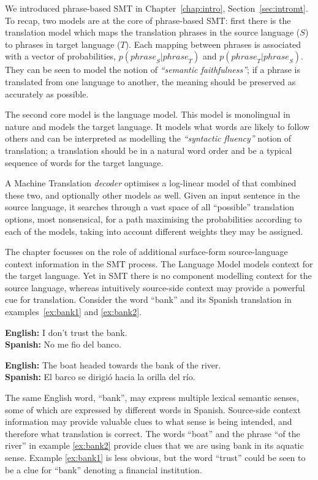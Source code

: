 We introduced phrase-based SMT in Chapter~\ref{chap:intro},
Section~\ref{sec:intromt}. To recap, two models are at the core of
phrase-based SMT: first there is the translation model which maps the
translation phrases in the source language ($S$) to phrases in target language
($T$). Each mapping between phrases is associated with a vector of
probabilities, $p({phrase}_S|{phrase}_T)$ and $p({phrase}_T|{phrase}_S)$. They
can be seen to model the notion of \emph{``semantic faithfulness''}; if a
phrase is translated from one language to another, the meaning should be
preserved as accurately as possible.

The second core model is the language model. This model is monolingual
in nature and models the target language. It models what words are
likely to follow others and can be interpreted as modelling the
\emph{``syntactic fluency''} notion of translation; a translation should be
in a natural word order and be a typical sequence of words for the
target language.

A Machine Translation \emph{decoder} optimises a log-linear model of that
combined these two, and optionally other models as well. Given an input
sentence in the source language, it searches through a vast space of all
``possible'' translation options, most nonsensical, for a path maximising the
probabilities according to each of the models, taking into account different
weights they may be assigned.

The chapter focusses on the role of additional
surface-form source-language context information in the SMT process. The Language Model models context
for the target language. Yet in SMT there is no component modelling
context for the source language, whereas intuitively source-side context may
provide a powerful cue for translation. Consider the word ``bank'' and its
Spanish translation in examples~\ref{ex:bank1} and \ref{ex:bank2}.

\begin{exe} %
\ex \textbf{English:} I don't trust the bank. \\
    \textbf{Spanish:} No me fio del banco.
\label{ex:bank1}

\ex \textbf{English:} The boat headed towards the bank of the river. \\
    \textbf{Spanish:} El barco se dirigió hacia la orilla del río.
\label{ex:bank2}
\end{exe}

The same English word, ``bank'', may express multiple lexical semantic senses, some of
which are expressed by different words in Spanish. Source-side context
information may provide valuable clues to what sense is being intended, and
therefore what translation is correct.  The words ``boat'' and the phrase ``of
the river'' in example \ref{ex:bank2} provide clues that we are using
bank in its aquatic sense. Example \ref{ex:bank1} is less obvious, but the
word ``trust'' could be seen to be a clue for ``bank'' denoting a
financial institution.

